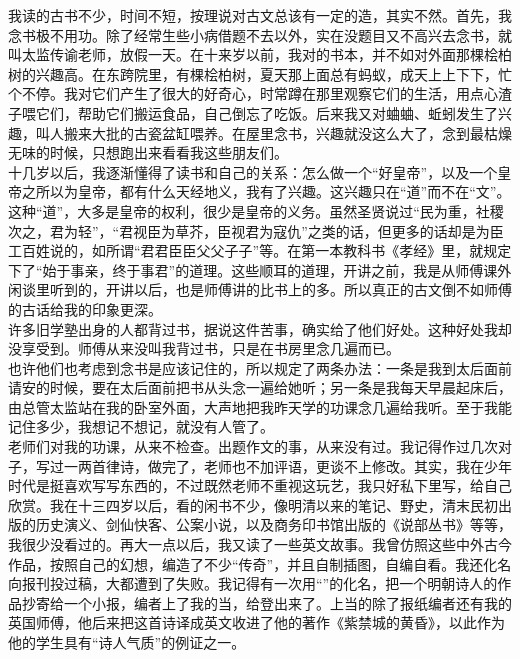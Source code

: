 我读的古书不少，时间不短，按理说对古文总该有一定的造，其实不然。首先，我念书极不用功。除了经常生些小病借题不去以外，实在没题目又不高兴去念书，就叫太监传谕老师，放假一天。在十来岁以前，我对的书本，并不如对外面那棵桧柏树的兴趣高。在东跨院里，有棵桧柏树，夏天那上面总有蚂蚁，成天上上下下，忙个不停。我对它们产生了很大的好奇心，时常蹲在那里观察它们的生活，用点心渣子喂它们，帮助它们搬运食品，自己倒忘了吃饭。后来我又对蛐蛐、蚯蚓发生了兴趣，叫人搬来大批的古瓷盆缸喂养。在屋里念书，兴趣就没这么大了，念到最枯燥无味的时候，只想跑出来看看我这些朋友们。\\

十几岁以后，我逐渐懂得了读书和自己的关系：怎么做一个“好皇帝”，以及一个皇帝之所以为皇帝，都有什么天经地义，我有了兴趣。这兴趣只在“道”而不在“文”。这种“道”，大多是皇帝的权利，很少是皇帝的义务。虽然圣贤说过“民为重，社稷次之，君为轻”，“君视臣为草芥，臣视君为寇仇”之类的话，但更多的话却是为臣工百姓说的，如所谓“君君臣臣父父子子”等。在第一本教科书《孝经》里，就规定下了“始于事亲，终于事君”的道理。这些顺耳的道理，开讲之前，我是从师傅课外闲谈里听到的，开讲以后，也是师傅讲的比书上的多。所以真正的古文倒不如师傅的古话给我的印象更深。\\

许多旧学塾出身的人都背过书，据说这件苦事，确实给了他们好处。这种好处我却没享受到。师傅从来没叫我背过书，只是在书房里念几遍而已。\\

也许他们也考虑到念书是应该记住的，所以规定了两条办法：一条是我到太后面前请安的时候，要在太后面前把书从头念一遍给她听；另一条是我每天早晨起床后，由总管太监站在我的卧室外面，大声地把我昨天学的功课念几遍给我听。至于我能记住多少，我想记不想记，就没有人管了。\\

老师们对我的功课，从来不检查。出题作文的事，从来没有过。我记得作过几次对子，写过一两首律诗，做完了，老师也不加评语，更谈不上修改。其实，我在少年时代是挺喜欢写写东西的，不过既然老师不重视这玩艺，我只好私下里写，给自己欣赏。我在十三四岁以后，看的闲书不少，像明清以来的笔记、野史，清末民初出版的历史演义、剑仙快客、公案小说，以及商务印书馆出版的《说部丛书》等等，我很少没看过的。再大一点以后，我又读了一些英文故事。我曾仿照这些中外古今作品，按照自己的幻想，编造了不少“传奇”，并且自制插图，自编自看。我还化名向报刊投过稿，大都遭到了失败。我记得有一次用“”的化名，把一个明朝诗人的作品抄寄给一个小报，编者上了我的当，给登出来了。上当的除了报纸编者还有我的英国师傅，他后来把这首诗译成英文收进了他的著作《紫禁城的黄昏》，以此作为他的学生具有“诗人气质”的例证之一。\\

